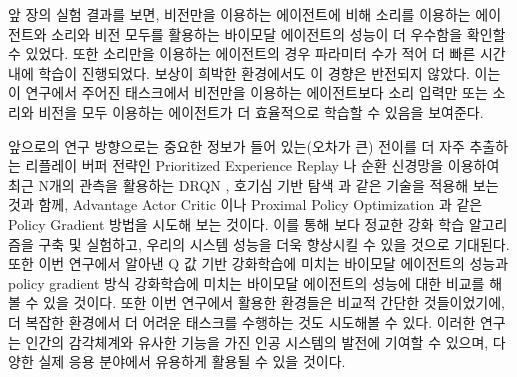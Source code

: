 \documentclass[oneside, under, ko]{snuthesis}
\begin{document}
앞 장의 실험 결과를 보면, 비전만을 이용하는 에이전트에 비해 소리를 이용하는 에이전트와 소리와 비전 모두를 활용하는 바이모달 에이전트의 성능이 더 우수함을 확인할 수 있었다. 또한 소리만을 이용하는 에이전트의 경우 파라미터 수가 적어 더 빠른 시간 내에 학습이 진행되었다. 보상이 희박한 환경에서도 이 경향은 반전되지 않았다. 이는 이 연구에서 주어진 태스크에서 비전만을 이용하는 에이전트보다 소리 입력만 또는 소리와 비전을 모두 이용하는 에이전트가 더 효율적으로 학습할 수 있음을 보여준다.

앞으로의 연구 방향으로는 중요한 정보가 들어 있는(오차가 큰) 전이를 더 자주 추출하는 리플레이 버퍼 전략인 Prioritized Experience Replay \cite{per}나 순환 신경망을 이용하여 최근 N개의 관측을 활용하는 DRQN \cite{POMDP}, 호기심 기반 탐색 \cite{curious}과 같은 기술을 적용해 보는 것과 함께, Advantage Actor Critic \cite{A2C}이나 Proximal Policy Optimization \cite{PPO}과 같은 Policy Gradient 방법을 시도해 보는 것이다. 이를 통해 보다 정교한 강화 학습 알고리즘을 구축 및 실험하고, 우리의 시스템 성능을 더욱 향상시킬 수 있을 것으로 기대된다. 또한 이번 연구에서 알아낸 Q 값 기반 강화학습에 미치는 바이모달 에이전트의 성능과 policy gradient 방식 강화학습에 미치는 바이모달 에이전트의 성능에 대한 비교를 해볼 수 있을 것이다. 또한 이번 연구에서 활용한 환경들은 비교적 간단한 것들이었기에, 더 복잡한 환경에서 더 어려운 태스크를 수행하는 것도 시도해볼 수 있다. 이러한 연구는 인간의 감각체계와 유사한 기능을 가진 인공 시스템의 발전에 기여할 수 있으며, 다양한 실제 응용 분야에서 유용하게 활용될 수 있을 것이다.
\end{document}
